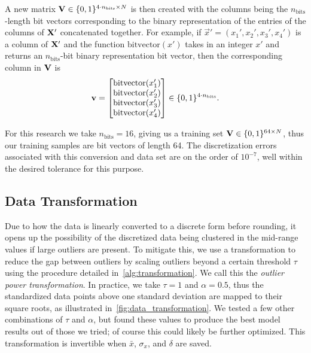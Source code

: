 A new matrix \( \mathbf{V} \in \{0,1\}^{4\cdot n_\text{bits} \times N} \) is then created with the columns being the \( n_\text{bits} \)-length bit vectors corresponding to the binary representation of the entries of the columns of \( \mathbf{X}' \) concatenated together.
For example, if \( \vec{x}' = (x_1',x_2',x_3',x_4') \) is a column of \( \mathbf{X}' \) and the function \( \text{bitvector}(x') \) takes in an integer \( x' \) and returns an \( n_\text{bits} \)-bit binary representation bit vector, then the corresponding column in \( \mathbf{V} \) is
\begin{align}
    \mathbf{v} = \begin{bmatrix}
        \text{bitvector}(x_1') \\
        \text{bitvector}(x_2') \\
        \text{bitvector}(x_3') \\
        \text{bitvector}(x_4') \\
    \end{bmatrix}
    \in \{0,1\}^{4\cdot n_\text{bits}}.
\end{align}

For this research we take \( n_\text{bits} = 16 \), giving us a training set \( \mathbf{V} \in \{0,1\}^{64 \times N} \), thus our training samples are bit vectors of length 64.
The discretization errors associated with this conversion and data set are on the order of \( 10^{-7} \), well within the desired tolerance for this purpose.

\subsection{Data Transformation}\label{sec:outlier_transform}
Due to how the data is linearly converted to a discrete form before rounding, it opens up the possibility of the discretized data being clustered in the mid-range values if large outliers are present.
To mitigate this, we use a transformation to reduce the gap between outliers by scaling outliers beyond a certain threshold \( \tau \) using the procedure detailed in~\cref{alg:transformation}.
We call this the \textit{outlier power transformation}.
In practice, we take \( \tau = 1 \) and \( \alpha = 0.5 \), thus the standardized data points above one standard deviation are mapped to their square roots, as illustrated in~\cref{fig:data_transformation}.
We tested a few other combinations of \( \tau \) and \( \alpha \), but found these values to produce the best model results out of those we tried; of course this could likely be further optimized.
This transformation is invertible when \( \bar{x} \), \( \sigma_x \), and \( \delta \) are saved.

